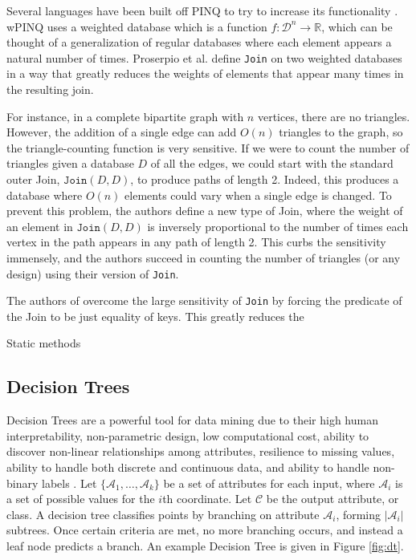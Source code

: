 \documentclass[11pt]{article}
\begin{document}
Several languages have been built off PINQ to try to increase its functionality \cite{Proserpio:2014} \cite{Johnson:2017}. wPINQ \cite{Proserpio:2014} uses a weighted database which is a function $f : \mathcal{D}^n \rightarrow \mathbb{R}$, which can be thought of a generalization of regular databases where each element appears a natural number of times. Proserpio et al. define \texttt{Join} on two weighted databases in a way that greatly reduces the weights of elements that appear many times in the resulting join.

For instance, in a complete bipartite graph with $n$ vertices, there are no triangles. However, the addition of a single edge can add $O(n)$ triangles to the graph, so the triangle-counting function is very sensitive. If we were to count the number of triangles given a database $D$ of all the edges, we could start with the standard outer Join, $\texttt{Join}(D, D)$, to produce paths of length 2. Indeed, this produces a database where $O(n)$ elements could vary when a single edge is changed. To prevent this problem, the authors define a new type of Join, where the weight of an element in $\texttt{Join}(D, D)$ is inversely proportional to the number of times each vertex in the path appears in any path of length 2. This curbs the sensitivity immensely, and the authors succeed in counting the number of triangles (or any design) using their version of \texttt{Join}.

The authors of \cite{Johnson:2017} overcome the large sensitivity of \texttt{Join} by forcing the predicate of the Join to be just equality of keys. This greatly reduces the 

Static methods

\subsection{Decision Trees}

Decision Trees are a powerful tool for data mining due to their high human interpretability, non-parametric design, low computational cost, ability to discover non-linear relationships among attributes, resilience to missing values, ability to handle both discrete and continuous data, and ability to handle non-binary labels \cite{Fletcher:2016}. Let $\{\mathcal{A}_1, \ldots, \mathcal{A}_k\}$ be a set of attributes for each input, where $\mathcal{A}_i$ is a set of possible values for the $i$th coordinate. Let $\mathcal{C}$ be the output attribute, or class. A decision tree classifies points by branching on attribute $\mathcal{A}_i$, forming $|\mathcal{A}_i|$ subtrees. Once certain criteria are met, no more branching occurs, and instead a leaf node predicts a branch. An example Decision Tree is given in Figure \ref{fig:dt}.
\end{document}
